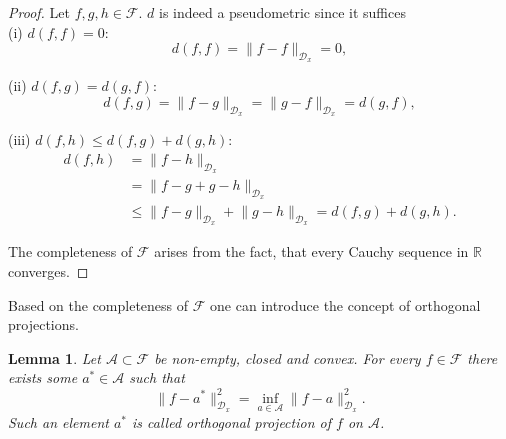 \documentclass[11pt, a4paper]{article}
\newtheorem{lemma}[theorem]{Lemma}
\newcommand{\R}{\mathds{R}}
\newcommand{\A}{\mathcal{A}}
\newcommand{\D}{\mathcal{D}}
\newcommand{\F}{\mathcal{F}}
\begin{document}
\begin{proof}
Let $f,g,h \in \F$. $d$ is indeed a pseudometric since it suffices \\

(i) $d(f,f) = 0$:
\[ d(f,f) = \big \| f - f \big \|_{\D_x} = 0, \]

(ii) $d(f,g) = d(g,f)$:
\[ d(f,g) = \big \| f - g \big \|_{\D_x} = \big \| g - f \big \|_{\D_x} = d(g,f), \]

(iii) $d(f,h) \le d(f,g) + d(g,h)$:
\[ \begin{split} 
d(f,h) &= \big \| f - h \big \|_{\D_x} \\\ &= \big \| f - g + g - h \big \|_{\D_x} \\\ &\le \big \| f - g  \big \|_{\D_x} + \big \| g - h \big \|_{\D_x} = d(f,g) + d(g,h). \end{split} \]

The completeness of $\F$ arises from the fact, that every Cauchy sequence in $\R$ converges.
\end{proof}

Based on the completeness of $\F$ one can introduce the concept of orthogonal projections.

\begin{lemma} \label{lem:projection}
Let $\A \subset \F$ be non-empty, closed and convex. For every $f \in \F$ there exists some $a^* \in \A$ such that 
\[ \big \| f - a^* \big \|_{\D_x}^2 = \inf_{a \in \A} \big \| f - a \big \|_{\D_x}^2. \]
Such an element $a^*$ is called orthogonal projection of $f$ on $\A$.
\end{lemma}
\end{document}
